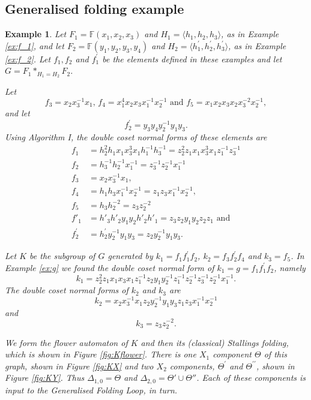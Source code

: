 \documentclass[a4paper,12pt]{article}
\newcommand{\D}{\Delta }
\newcommand{\T}{\Theta }
\newtheorem{exam}[theorem]{Example}
\newenvironment{example}{\begin{exam} \rm}{\end{exam}}
\numberwithin{equation}{section}
\numberwithin{figure}{section}
\newcommand{\FF}{\ensuremath{\mathbb{F}}}
\newcommand{\la}{\langle}
\newcommand{\ra}{\rangle}
\begin{document}
\subsection{Generalised folding example}
\begin{example}\label{ex:K}
Let $F_1=\FF(x_1,x_2,x_3)$ and $H_1=\la h_1,h_2,h_3\ra$,
as in Example \ref{ex:f_1}, and let $F_2=\FF(y_1,y_2,y_3,y_4)$ and
$H_2=\la h_1^\prime, h_2^\prime, h_3^\prime\ra$, as in Example \ref{ex:f_2}.
Let $f_1,f_2$ and $f_1^\prime$ be the elements defined in these examples
 and let $G=F_1\ast_{H_1=H_2} F_2$.

Let
\[f_3=x_2x_3^{-1}x_1,\, f_4= x_1^4 x_2 x_3 x_1^{-1} x_2^{-1}
\textrm{ and } f_5=x_1x_2x_3x_2x_3^{-2}x_2^{-1},\]
and let
\[ f_2^\prime =y_3y_4y_2^{-1}y_1y_3.\]
Using Algorithm I, the double coset normal forms of these elements are
\begin{align*}
f_1&=h_2^{2}h_1 x_1x_3^3x_1 h_1^{-1}h_3^{-1}=z_2^{2}z_1 x_1x_3^3x_1 z_1^{-1}z_3^{-1}\\
f_2&=h_3^{-1}h_2^{-1} x_1^{-1}=z_3^{-1}z_2^{-1} x_1^{-1}\\
f_3 & = x_2x_3^{-1}x_1,\\
f_4 &= h_1h_3 x_1^{-1}x_2^{-1}=z_1z_3 x_1^{-1}x_2^{-1},\\
f_5 &= h_3h_2^{-2}=z_3z_2^{-2}\\
f'_1&=h'_3h'_2y_1y_2h'_2h'_1=z_3z_2y_1y_2z_2z_1\textrm{ and }\\
f_2^\prime &= h_2^\prime y_2^{-1}y_1y_3= z_2 y_2^{-1}y_1y_3.
\end{align*}

Let $K$ be the subgroup of $G$ generated by $k_1=f_1f_1^\prime f_2$,
$k_2= f_3f_2^\prime f_4$ and $k_3=f_5$.
In Example \ref{ex:g} we found the double coset normal form of
$k_1=g=f_1f_1^\prime f_2$, namely
\[k_1=z_2^2 z_1  x_1 x_3 x_1 z_1^{-1}
z_2y_1y_2^{-1} z_1^{-1}z_2^{-1}
z_3^{-1}z_2^{-1} x_1^{-1}.\]
The double coset normal forms of $k_2$ and $k_3$ are
\[k_2=  x_2x_3^{-1}x_1  z_2 y_2^{-1}y_1y_3 z_1z_3 x_1^{-1}x_2^{-1}\]
and
\[k_3 = z_3z_2^{-2}.\]

We form the flower automaton of $K$ and then its (classical) Stallings folding,
which is
shown in Figure \ref{fig:Kflower}.
There is one $X_1$ component $\Theta$ of this graph, shown in Figure \ref{fig:KX}
and two $X_2$ components, $\Theta^\prime$ and $\Theta^{\prime\prime}$,
shown in Figure \ref{fig:KY}. Thus $\D_{1,0}=\Theta$ and 
$\D_{2,0}=\T'\cup \T''$. Each of these components is input to
 the Generalised Folding Loop, in turn.  


\end{example}
\end{document}
